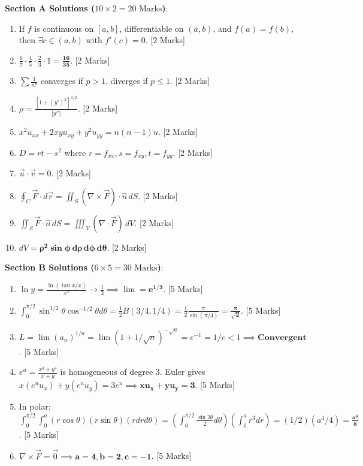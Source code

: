 \begin{solutionbox}
\noindent\textbf{Section A Solutions ($10 \times 2 = 20\text{ Marks}$)}:
\begin{enumerate}
    \item If $f$ is continuous on ${[a,b]}$, differentiable on $(a,b)$, and $f(a)=f(b)$, then $\exists c \in (a,b)$ with $f'(c)=0$. [2 Marks]
    \item $\frac{6}{7} \cdot \frac{4}{5} \cdot \frac{2}{3} \cdot 1 = \mathbf{\frac{16}{35}}$. [2 Marks]
    \item $\sum \frac{1}{n^p}$ converges if $p > 1$, diverges if $p \le 1$. [2 Marks]
    \item $\rho = \frac{[1+(y')^2]^{3/2}}{|y''|}$. [2 Marks]
    \item $x^2 u_{xx} + 2xy u_{xy} + y^2 u_{yy} = n(n-1) u$. [2 Marks]
    \item $D = rt - s^2$ where $r = f_{xx}, s = f_{xy}, t = f_{yy}$. [2 Marks]
    \item $\vec{u} \cdot \vec{v} = 0$. [2 Marks]
    \item $\oint_C \vec{F}\cdot d\vec{r} = \iint_S (\nabla\times\vec{F})\cdot\hat{n}\,dS$. [2 Marks]
    \item $\iint_S \vec{F}\cdot\hat{n}\,dS = \iiint_V (\nabla\cdot\vec{F})\,dV$. [2 Marks]
    \item $dV = \mathbf{\rho^2 \sin\phi\,d\rho\,d\phi\,d\theta}$. [2 Marks]
\end{enumerate}

\medskip
\noindent\textbf{Section B Solutions ($6 \times 5 = 30\text{ Marks}$)}:
\begin{enumerate}[start=11]
    \item $\ln y = \frac{\ln(\tan x/x)}{x^2} \to \frac{1}{3} \implies \lim = \mathbf{e^{1/3}}$. [5 Marks]
    \item $\int_0^{\pi/2}\sin^{1/2}\theta\cos^{-1/2}\theta d\theta = \frac{1}{2}B(3/4, 1/4) = \frac{1}{2}\frac{\pi}{\sin(\pi/4)} = \mathbf{\frac{\pi}{\sqrt{2}}}$. [5 Marks]
    \item $L = \lim (a_n)^{1/n} = \lim (1 + 1/\sqrt{n})^{-\sqrt{n}} = e^{-1} = 1/e < 1 \implies \mathbf{\text{Convergent}}$. [5 Marks]
    \item $e^u = \frac{x^4+y^4}{x+y}$ is homogeneous of degree $3$. Euler gives $x(e^u u_x) + y(e^u u_y) = 3e^u \implies \mathbf{x u_x + y u_y = 3}$. [5 Marks]
    \item In polar: $\int_0^{\pi/2} \int_0^a (r\cos\theta)(r\sin\theta)(r dr d\theta) = (\int_0^{\pi/2}\frac{\sin 2\theta}{2}d\theta)(\int_0^a r^3 dr) = (1/2)(a^4/4) = \mathbf{\frac{a^4}{8}}$. [5 Marks]
    \item $\nabla\times\vec{F} = \vec{0} \implies \mathbf{a = 4, b = 2, c = -1}$. [5 Marks]
\end{enumerate}


\end{solutionbox}
